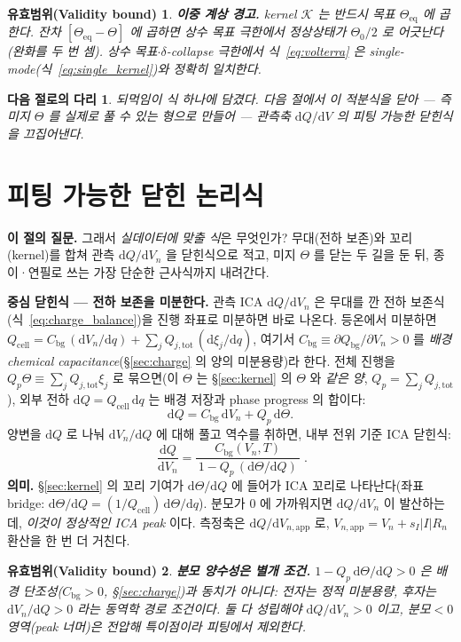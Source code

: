 \documentclass[11pt,a4paper]{article}
\newtheorem*{boundbox}{유효범위(Validity bound)}
\newtheorem*{bridgebox}{다음 절로의 다리}
\newcommand{\dd}{\mathrm{d}}
\newcommand{\eq}{\mathrm{eq}}
\newcommand{\app}{\mathrm{app}}
\newcommand{\bg}{\mathrm{bg}}
\newcommand{\cell}{\mathrm{cell}}
\newcommand{\tot}{\mathrm{tot}}
\begin{document}
\begin{boundbox}
\textbf{이중 계상 경고.} kernel $\mathcal K$ 는 반드시 \emph{목표} $\Theta_\eq$ 에 곱한다. 잔차
$[\Theta_\eq-\Theta]$ 에 곱하면 상수 목표 극한에서 정상상태가 $\Theta_0/2$ 로 어긋난다(완화를 두 번 셈). 상수
목표$\cdot\delta$-collapse 극한에서 식~\eqref{eq:volterra} 은 single-mode(식~\eqref{eq:single_kernel})와 정확히
일치한다.
\end{boundbox}

\begin{bridgebox}
되먹임이 식 하나에 담겼다. 다음 절에서 이 적분식을 \emph{닫아} — 즉 미지 $\Theta$ 를 실제로 풀 수 있는 형으로
만들어 — 관측축 $\dd Q/\dd V$ 의 피팅 가능한 닫힌식을 끄집어낸다.
\end{bridgebox}

\section{피팅 가능한 닫힌 논리식}\label{sec:fiteq}
\textbf{이 절의 질문.} 그래서 \emph{실데이터에 맞출 식}은 무엇인가? 무대(전하 보존)와 꼬리(kernel)를 합쳐
관측 $\dd Q/\dd V_n$ 을 닫힌식으로 적고, 미지 $\Theta$ 를 닫는 두 길을 둔 뒤, 종이·연필로 쓰는 가장 단순한
근사식까지 내려간다.

\textbf{중심 닫힌식 — 전하 보존을 미분한다.} 관측 ICA $\dd Q/\dd V_n$ 은 무대를 깐 전하 보존식
(식~\eqref{eq:charge_balance})을 진행 좌표로 미분하면 바로 나온다. 등온에서 미분하면
$Q_\cell=C_\bg\,(\dd V_n/\dd q)+\sum_j Q_{j,\tot}\,(\dd\xi_j/\dd q)$, 여기서 $C_\bg\equiv\partial Q_\bg/
\partial V_n>0$ 를 \emph{배경 chemical capacitance}(\S\ref{sec:charge} 의 양의 미분용량)라 한다. 전체 진행을
$Q_p\Theta\equiv\sum_j Q_{j,\tot}\xi_j$ 로 묶으면(이 $\Theta$ 는 \S\ref{sec:kernel} 의 $\Theta$ 와 \emph{같은
양}, $Q_p=\sum_j Q_{j,\tot}$), 외부 전하 $\dd Q=Q_\cell\,\dd q$ 는 배경 저장과 phase progress 의 합이다:
\begin{equation}
\dd Q=C_\bg\,\dd V_n+Q_p\,\dd\Theta.
\label{eq:dQsplit}
\end{equation}
양변을 $\dd Q$ 로 나눠 $\dd V_n/\dd Q$ 에 대해 풀고 역수를 취하면, 내부 전위 기준 ICA 닫힌식:
\begin{equation}
\boxed{\;\frac{\dd Q}{\dd V_n}=\frac{C_\bg(V_n,T)}{\,1-Q_p\,(\dd\Theta/\dd Q)\,}\;.}
\label{eq:fiteq}
\end{equation}
\textbf{의미.} \S\ref{sec:kernel} 의 꼬리 기여가 $\dd\Theta/\dd Q$ 에 들어가 ICA 꼬리로 나타난다(좌표 bridge:
$\dd\Theta/\dd Q=(1/Q_\cell)\,\dd\Theta/\dd q$). 분모가 0 에 가까워지면 $\dd Q/\dd V_n$ 이 발산하는데,
\emph{이것이 정상적인 ICA peak} 이다. 측정축은 $\dd Q/\dd V_{n,\app}$ 로, $V_{n,\app}=V_n+s_I|I|R_n$ 환산을 한 번
더 거친다.
\begin{boundbox}
\textbf{분모 양수성은 별개 조건.} $1-Q_p\,\dd\Theta/\dd Q>0$ 은 배경 단조성($C_\bg>0$, \S\ref{sec:charge})과
\emph{동치가 아니다}: 전자는 정적 미분용량, 후자는 $\dd V_n/\dd Q>0$ 라는 동역학 경로 조건이다. 둘 다
성립해야 $\dd Q/\dd V_n>0$ 이고, 분모$<0$ 영역(peak 너머)은 전압해 특이점이라 피팅에서 제외한다.
\end{boundbox}
\end{document}
